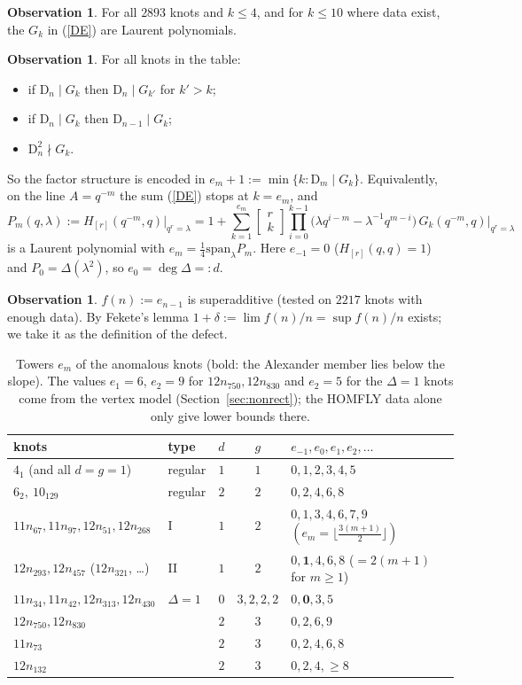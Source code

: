 \documentclass[11pt]{article}
\theoremstyle{definition}
\newtheorem{observation}[theorem]{Observation}
\theoremstyle{remark}
\newcommand{\D}{\mathrm{D}}
\newcommand{\qbin}[2]{\left[\begin{smallmatrix}#1\\#2\end{smallmatrix}\right]}
\begin{document}
\begin{observation}\label{obs:plus}
For all $2893$ knots and $k\le4$, and for $k\le10$ where data exist, the $G_k$ in (\ref{DE}) are Laurent
polynomials.
\end{observation}

\begin{observation}\label{obs:pers}
For all knots in the table:
\begin{itemize}
\item[(i)] if $\D_n\mid G_k$ then $\D_n\mid G_{k'}$ for $k'>k$;
\item[(ii)] if $\D_n\mid G_k$ then $\D_{n-1}\mid G_k$;
\item[(iii)] $\D_n^2\nmid G_k$.
\end{itemize}
\end{observation}

So the factor structure is encoded in $e_m+1:=\min\{k:\D_m\mid G_k\}$.  Equivalently, on the line $A=q^{-m}$ the
sum (\ref{DE}) stops at $k=e_m$, and
\[
  P_m(q,\lambda):=H_{[r]}(q^{-m},q)\big|_{q^r=\lambda}
  =1+\sum_{k=1}^{e_m}\qbin rk\prod_{i=0}^{k-1}\big(\lambda q^{i-m}-\lambda^{-1}q^{m-i}\big)\,G_k(q^{-m},q)\Big|_{q^r=\lambda}
\]
is a Laurent polynomial with $e_m=\frac14\mathrm{span}_\lambda P_m$.  Here $e_{-1}=0$ ($H_{[r]}(q,q)=1$) and
$P_0=\Delta(\lambda^2)$, so $e_0=\deg\Delta=:d$.

\begin{observation}\label{obs:superadd}
$f(n):=e_{n-1}$ is superadditive (tested on $2217$ knots with enough data).  By Fekete's lemma
$1+\delta:=\lim f(n)/n=\sup f(n)/n$ exists; we take it as the definition of the defect.
\end{observation}

\begin{table}[h]
\centering
\begin{tabular}{llcc l}
\toprule
knots & type & $d$ & $g$ & $e_{-1},e_0,e_1,e_2,\dots$\\
\midrule
$4_1$ (and all $d=g=1$) & regular & $1$ & $1$ & $0,1,2,3,4,5$\\
$6_2,\ 10_{129}$ & regular & $2$ & $2$ & $0,2,4,6,8$\\
$11n_{67},11n_{97},12n_{51},12n_{268}$ & I & $1$ & $2$ & $0,1,3,4,6,7,9$ \quad $(e_m=\lfloor\frac{3(m+1)}2\rfloor)$\\
$12n_{293},12n_{457}$ ($12n_{321}$, \dots) & II & $1$ & $2$ & $0,\mathbf 1,4,6,8$ \quad ($=2(m+1)$ for $m\ge1$)\\
$11n_{34},11n_{42},12n_{313},12n_{430}$ & $\Delta=1$ & $0$ & $3,2,2,2$ & $0,\mathbf 0,3,5$\\
$12n_{750},12n_{830}$ & & $2$ & $3$ & $0,2,6,9$\\
$11n_{73}$ & & $2$ & $3$ & $0,2,4,6,8$\\
$12n_{132}$ & & $2$ & $3$ & $0,2,4,\ge8$\\
\bottomrule
\end{tabular}
\caption{Towers $e_m$ of the anomalous knots (bold: the Alexander member lies below the slope).  The values
$e_1=6$, $e_2=9$ for $12n_{750},12n_{830}$ and $e_2=5$ for the $\Delta=1$ knots come from the vertex model
(Section~\ref{sec:nonrect}); the HOMFLY data alone only give lower bounds there.}\label{tab:anom}
\end{table}
\end{document}
